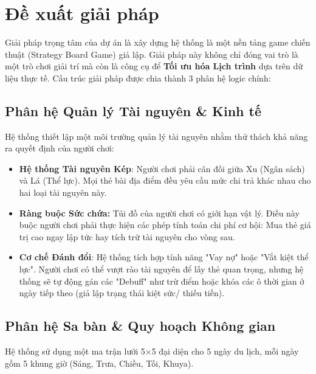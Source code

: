 \newpage

\chapter{Đề xuất giải pháp}


Giải pháp trọng tâm của dự án là xây dựng hệ thống là một nền tảng game chiến thuật (Strategy Board Game) giả lập. Giải pháp này không chỉ đóng vai trò là một trò chơi giải trí mà còn là công cụ để \textbf{Tối ưu hóa Lịch trình} dựa trên dữ liệu thực tế. Cấu trúc giải pháp được chia thành 3 phân hệ logic chính:

\section{Phân hệ Quản lý Tài nguyên \& Kinh tế}

Hệ thống thiết lập một môi trường quản lý tài nguyên nhằm thử thách khả năng ra quyết định của người chơi:

\begin{itemize}[topsep=0pt, itemsep=2.5pt, leftmargin=1.5cm]
    \item \textbf{Hệ thống Tài nguyên Kép}: Người chơi phải cân đối giữa Xu (Ngân sách) và Lá (Thể lực). Mọi thẻ bài địa điểm đều yêu cầu mức chi trả khác nhau cho hai loại tài nguyên này.
    \item \textbf{Ràng buộc Sức chứa:} Túi đồ của người chơi có giới hạn vật lý. Điều này buộc người chơi phải thực hiện các phép tính toán chi phí cơ hội: Mua thẻ giá trị cao ngay lập tức hay tích trữ tài nguyên cho vòng sau.
    \item \textbf{Cơ chế Đánh đổi}: Hệ thống tích hợp tính năng "Vay nợ" hoặc "Vắt kiệt thể lực". Người chơi có thể vượt rào tài nguyên để lấy thẻ quan trọng, nhưng hệ thống sẽ tự động gán các "Debuff" như trừ điểm hoặc khóa các ô thời gian ở ngày tiếp theo (giả lập trạng thái kiệt sức/ thiếu tiền).
\end{itemize}

\section{Phân hệ Sa bàn \& Quy hoạch Không gian}

Hệ thống sử dụng một ma trận lưới 5×5 đại diện cho 5 ngày du lịch, mỗi ngày gồm 5 khung giờ (Sáng, Trưa, Chiều, Tối, Khuya).

